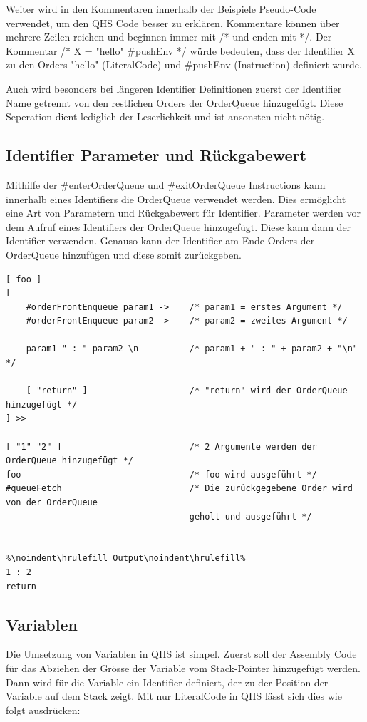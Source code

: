 Weiter wird in den Kommentaren innerhalb der Beispiele Pseudo-Code verwendet, um den QHS Code besser zu erklären. Kommentare können über mehrere Zeilen reichen und beginnen immer mit /* und enden mit */.
Der Kommentar /* X = "hello" \#pushEnv */ würde bedeuten, dass der Identifier X zu den Orders "hello" (LiteralCode) und \#pushEnv (Instruction) definiert wurde. 

Auch wird besonders bei längeren Identifier Definitionen zuerst der Identifier Name getrennt von den restlichen Orders der OrderQueue hinzugefügt. Diese Seperation dient lediglich der Leserlichkeit und ist ansonsten nicht nötig.

\subsection{Identifier Parameter und Rückgabewert}
Mithilfe der \#enterOrderQueue und \#exitOrderQueue Instructions kann innerhalb eines Identifiers die OrderQueue verwendet werden. Dies ermöglicht eine Art von Parametern und Rückgabewert für Identifier.
Parameter werden vor dem Aufruf eines Identifiers der OrderQueue hinzugefügt. Diese kann dann der Identifier verwenden. Genauso kann der Identifier am Ende Orders der OrderQueue hinzufügen und diese somit zurückgeben.

\begin{lstlisting}[language=QHS, caption=Parameter und Rückgabewert eines Identifiers]
[ foo ]
[
    #orderFrontEnqueue param1 ->    /* param1 = erstes Argument */
    #orderFrontEnqueue param2 ->    /* param2 = zweites Argument */

    param1 " : " param2 \n          /* param1 + " : " + param2 + "\n" */

    [ "return" ]                    /* "return" wird der OrderQueue hinzugefügt */
] >>

[ "1" "2" ]                         /* 2 Argumente werden der OrderQueue hinzugefügt */
foo                                 /* foo wird ausgeführt */
#queueFetch                         /* Die zurückgegebene Order wird von der OrderQueue
                                    geholt und ausgeführt */


%\noindent\hrulefill Output\noindent\hrulefill%
1 : 2
return
\end{lstlisting}


\subsection{Variablen} \label{sec:qhs-vars}
Die Umsetzung von Variablen in QHS ist simpel. Zuerst soll der Assembly Code für das Abziehen der Grösse der Variable vom Stack-Pointer hinzugefügt werden.
Dann wird für die Variable ein Identifier definiert, der zu der Position der Variable auf dem Stack zeigt.
Mit nur LiteralCode in QHS lässt sich dies wie folgt ausdrücken:

